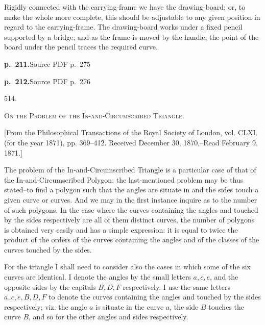 \documentclass[11pt,a4paper]{article}
\newcommand{\sourcepage}[2]{\par\bigskip\noindent\textbf{p.~#1.}\hfill{\footnotesize Source PDF p.~#2}\par\nobreak\medskip}
\newcommand{\articleno}[1]{\begin{center}\large #1.\end{center}}
\newcommand{\paperhead}[1]{\begin{center}\scshape #1\end{center}}
\newcommand{\journalnote}[1]{\begin{center}\small #1\end{center}}
\begin{document}
Rigidly connected with the carrying-frame we have the drawing-board; or, to make the whole more complete, this should be adjustable to any given position in regard to the carrying-frame. The drawing-board works under a fixed pencil supported by a bridge; and as the frame is moved by the handle, the point of the board under the pencil traces the required curve.

\sourcepage{211}{275}
\begin{center}
\end{center}

\clearpage
\sourcepage{212}{276}
\articleno{514}
\paperhead{On the Problem of the In-and-Circumscribed Triangle.}
\journalnote{[From the Philosophical Transactions of the Royal Society of London, vol. CLXI. (for the year 1871), pp. 369--412. Received December 30, 1870,--Read February 9, 1871.]}

The problem of the In-and-Circumscribed Triangle is a particular case of that of the In-and-Circumscribed Polygon: the last-mentioned problem may be thus stated--to find a polygon such that the angles are situate in and the sides touch a given curve or curves. And we may in the first instance inquire as to the number of such polygons. In the case where the curves containing the angles and touched by the sides respectively are all of them distinct curves, the number of polygons is obtained very easily and has a simple expression: it is equal to twice the product of the orders of the curves containing the angles and of the classes of the curves touched by the sides.

For the triangle I shall need to consider also the cases in which some of the six curves are identical. I denote the angles by the small letters $a,c,e$, and the opposite sides by the capitals $B,D,F$ respectively. I use the same letters $a,c,e,B,D,F$ to denote the curves containing the angles and touched by the sides respectively; viz. the angle $a$ is situate in the curve $a$, the side $B$ touches the curve $B$, and so for the other angles and sides respectively.
\end{document}
